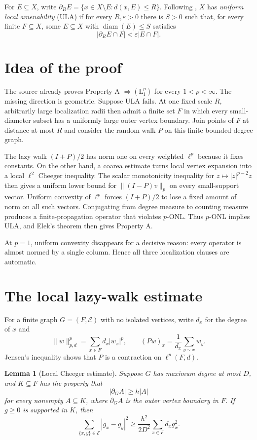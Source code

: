 \documentclass[11pt]{article}
\newtheorem{lemma}[theorem]{Lemma}
\newcommand{\diam}{\operatorname{diam}}
\begin{document}
For $E\subseteq X$, write
$\partial_R E=\{x\in X\setminus E:d(x,E)\le R\}$. Following \cite{ULA},
$X$ has \emph{uniform local amenability} (ULA) if for every $R,\varepsilon>0$
there is $S>0$ such that, for every finite $F\subseteq X$, some
$E\subseteq X$ with $\diam(E)\le S$ satisfies
\[
  |\partial_R E\cap F|<\varepsilon |E\cap F|.
  \tag{ULA}
\]

\section{Idea of the proof}

The source already proves Property A $\Rightarrow(\mathrm L_1^p)$ for every
$1<p<\infty$. The missing direction is geometric. Suppose ULA fails. At one
fixed scale $R$, arbitrarily large localization radii then admit a finite set
$F$ in which every small-diameter subset has a uniformly large outer vertex
boundary. Join points of $F$ at distance at most $R$ and consider the random
walk $P$ on this finite bounded-degree graph.

The lazy walk $(I+P)/2$ has norm one on every weighted $\ell^p$ because it
fixes constants. On the other hand, a coarea estimate turns local vertex
expansion into a local $\ell^2$ Cheeger inequality. The scalar monotonicity
inequality for $z\mapsto |z|^{p-2}z$ then gives a uniform lower bound for
$\|(I-P)v\|_p$ on every small-support vector. Uniform convexity of $\ell^p$
forces $(I+P)/2$ to lose a fixed amount of norm on all such vectors. Conjugating
from degree measure to counting measure produces a finite-propagation operator
that violates $p$-ONL. Thus $p$-ONL implies ULA, and Elek's theorem \cite{Elek}
then gives Property A.

At $p=1$, uniform convexity disappears for a decisive reason: every operator
is almost normed by a single column. Hence all three localization clauses are
automatic.

\section{The local lazy-walk estimate}

For a finite graph $G=(F,\mathcal E)$ with no isolated vertices, write $d_x$
for the degree of $x$ and
\[
 \|w\|_{p,d}^p=\sum_{x\in F}d_x|w_x|^p,
 \qquad
 (Pw)_x=\frac1{d_x}\sum_{y\sim x}w_y.
\]
Jensen's inequality shows that $P$ is a contraction on $\ell^p(F,d)$.

\begin{lemma}[Local Cheeger estimate]\label{lem:cheeger}
Suppose $G$ has maximum degree at most $D$, and $K\subseteq F$ has the
property that
\[
 |\partial_G A|\ge h|A|
 \tag{1}
\]
for every nonempty $A\subseteq K$, where $\partial_G A$ is the outer vertex
boundary in $F$. If $g\ge0$ is supported in $K$, then
\[
 \sum_{\{x,y\}\in\mathcal E}|g_x-g_y|^2
 \ge \frac{h^2}{2D^2}\sum_{x\in F}d_xg_x^2.
 \tag{2}
\]
\end{lemma}
\end{document}
